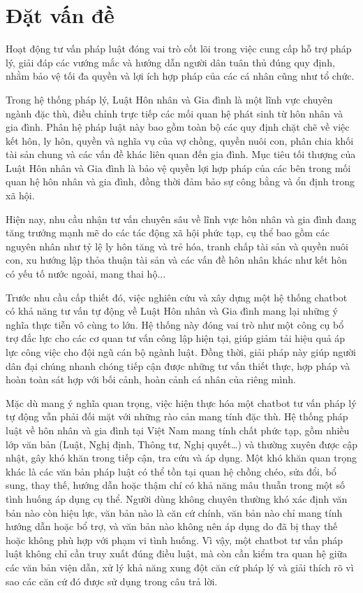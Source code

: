 \documentclass[../DoAn.tex]{subfiles}
\begin{document}
\section{Đặt vấn đề}
\label{section:1.1}

Hoạt động tư vấn pháp luật đóng vai trò cốt lõi trong việc cung cấp hỗ trợ pháp lý, giải đáp các vướng mắc và hướng dẫn người dân tuân thủ đúng quy định, nhằm bảo vệ tối đa quyền và lợi ích hợp pháp của các cá nhân cũng như tổ chức.

Trong hệ thống pháp lý, Luật Hôn nhân và Gia đình là một lĩnh vực chuyên ngành đặc thù, điều chỉnh trực tiếp các mối quan hệ phát sinh từ hôn nhân và gia đình. Phân hệ pháp luật này bao gồm toàn bộ các quy định chặt chẽ về việc kết hôn, ly hôn, quyền và nghĩa vụ của vợ chồng, quyền nuôi con, phân chia khối tài sản chung và các vấn đề khác liên quan đến gia đình. Mục tiêu tối thượng của Luật Hôn nhân và Gia đình là bảo vệ quyền lợi hợp pháp của các bên trong mối quan hệ hôn nhân và gia đình, đồng thời đảm bảo sự công bằng và ổn định trong xã hội.

Hiện nay, nhu cầu nhận tư vấn chuyên sâu về lĩnh vực hôn nhân và gia đình đang tăng trưởng mạnh mẽ do các tác động xã hội phức tạp, cụ thể bao gồm các nguyên nhân như tỷ lệ ly hôn tăng và trẻ hóa, tranh chấp tài sản và quyền nuôi con, xu hướng lập thỏa thuận tài sản và các vấn đề hôn nhân khác như kết hôn có yếu tố nước ngoài, mang thai hộ... 

Trước nhu cầu cấp thiết đó, việc nghiên cứu và xây dựng một hệ thống chatbot có khả năng tư vấn tự động về Luật Hôn nhân và Gia đình mang lại những ý nghĩa thực tiễn vô cùng to lớn. Hệ thống này đóng vai trò như một công cụ bổ trợ đắc lực cho các cơ quan tư vấn công lập hiện tại, giúp giảm tải hiệu quả áp lực công việc cho đội ngũ cán bộ ngành luật. Đồng thời, giải pháp này giúp người dân đại chúng nhanh chóng tiếp cận được những tư vấn thiết thực, hợp pháp và hoàn toàn sát hợp với bối cảnh, hoàn cảnh cá nhân của riêng mình.

Mặc dù mang ý nghĩa quan trọng, việc hiện thực hóa một chatbot tư vấn pháp lý tự động vẫn phải đối mặt với những rào cản mang tính đặc thù. Hệ thống pháp luật về hôn nhân và gia đình tại Việt Nam mang tính chất phức tạp, gồm nhiều lớp văn bản (Luật, Nghị định, Thông tư, Nghị quyết…) và thường xuyên được cập nhật, gây khó khăn trong tiếp cận, tra cứu và áp dụng. Một khó khăn quan trọng khác là các văn bản pháp luật có thể tồn tại quan hệ chồng chéo, sửa đổi, bổ sung, thay thế, hướng dẫn hoặc thậm chí có khả năng mâu thuẫn trong một số tình huống áp dụng cụ thể. Người dùng không chuyên thường khó xác định văn bản nào còn hiệu lực, văn bản nào là căn cứ chính, văn bản nào chỉ mang tính hướng dẫn hoặc bổ trợ, và văn bản nào không nên áp dụng do đã bị thay thế hoặc không phù hợp với phạm vi tình huống. Vì vậy, một chatbot tư vấn pháp luật không chỉ cần truy xuất đúng điều luật, mà còn cần kiểm tra quan hệ giữa các văn bản viện dẫn, xử lý khả năng xung đột căn cứ pháp lý và giải thích rõ vì sao các căn cứ đó được sử dụng trong câu trả lời.
\end{document}
